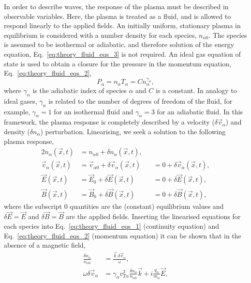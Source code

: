 In order to describe waves, the response of the plasma must be described in observable variables.
Here, the plasma is treated as a fluid, and is allowed to respond linearly to the applied fields.
An initially uniform, stationary plasma in equilibrium is considered with a number density for each species, $n_{\alpha 0}$.
The species is assumed to be isothermal or adiabatic, and therefore solution of the energy equation, Eq.~\ref{eq:theory_fluid_eqs_3} is not required.
An ideal gas equation of state is used to obtain a closure for the pressure in the momentum equation, Eq.~\ref{eq:theory_fluid_eqs_2},
\begin{equation}
    P_\alpha = n_\alpha T_\alpha = Cn_\alpha^{\gamma_\alpha},
\end{equation}
where $\gamma_\alpha$ is the adiabatic index of species $\alpha$ and $C$ is a constant.
In analogy to ideal gases, $\gamma_\alpha$ is related to the number of degrees of freedom of the fluid, for example, $\gamma_\alpha=1$ for an isothermal fluid and $\gamma_\alpha=3$ for an adiabatic fluid.
In this framework, the plasma response is completely described by a velocity ($\delta \vec{v}_\alpha$) and density ($\delta n_\alpha$) perturbation.
Linearising, we seek a solution to the following plasma response,
\begin{alignat}{2}
    n_\alpha(\vec{x},t) &= n_{\alpha 0} + \delta n_\alpha(\vec{x},t),&&\\
    \vec{v}_\alpha(\vec{x},t) &= \vec{v}_{\alpha 0} + \delta \vec{v}_\alpha(\vec{x},t) &&= 0 + \delta \vec{v}_\alpha(\vec{x},t),\\
    \vec{E}(\vec{x},t) &= \vec{E}_{0} + \delta \vec{E}(\vec{x},t) &&= 0 + \delta \vec{E}(\vec{x},t),\\
    \vec{B}(\vec{x},t) &= \vec{B}_{0} + \delta \vec{B}(\vec{x},t) &&= 0 + \delta \vec{B}(\vec{x},t),
\end{alignat}
where the subscript 0 quantities are the (constant) equilibrium values and $\delta\vec{E}=\vec{E}$ and $\delta\vec{B}=\vec{B}$ are the applied fields.
Inserting the linearised equations for each species into Eq.~\ref{eq:theory_fluid_eqs_1} (continuity equation) and Eq.~\ref{eq:theory_fluid_eqs_2} (momentum equation) it can be shown that in the absence of a magnetic field,
\begin{align}
    \label{eq:theory_wave1s_1}
    \frac{\delta n_\alpha}{n_{\alpha 0}} &= \frac{\vec{k}.\delta\vec{v}_\alpha}{\omega},\\
    \label{eq:theory_wave1s_2}
    \omega \delta\vec{v}_\alpha &= \gamma_\alpha v_{T\alpha}^2 \frac{\delta n_\alpha}{n_{\alpha 0}} \vec{k} + i\frac{q_\alpha}{m_\alpha}\vec{E},
\end{align}
